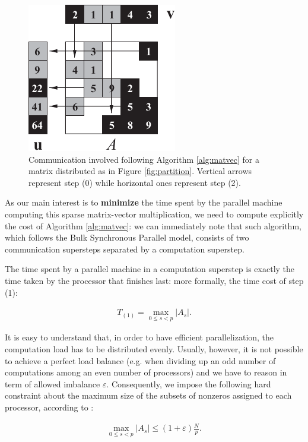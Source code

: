 \begin{figure}[h]
	\centering
	\includegraphics{img/communication}
	\caption{Communication involved following Algorithm \ref{alg:matvec} for a matrix distributed as in Figure \ref{fig:partition}. Vertical arrows represent step (0) while horizontal ones represent step (2).}
	\label{fig:communication}
\end{figure}



As our main interest is to \textbf{minimize} the time spent by the parallel machine computing this sparse matrix-vector multiplication, we need to compute explicitly the cost of Algorithm \ref{alg:matvec}: we can immediately note that such algorithm, which follows the Bulk Synchronous Parallel model\cite{bsp_paper}, consists of two communication supersteps separated by a computation superstep.

The time spent by a parallel machine in a computation superstep is exactly the time taken by the processor that finishes last: more formally, the time cost of step (1):

\begin{align}
	T_{(1)} = \max_{0 \leq s < p } |A_s|.
	\label{eq:T_comp}
\end{align}

It is easy to understand that, in order to have efficient parallelization, the computation load has to be distributed evenly. Usually, however, it is not possible to achieve a perfect load balance (e.g. when dividing up an odd number of computations among an even number of processors) and we have to reason in term of allowed imbalance $\varepsilon$. Consequently, we impose the following hard constraint about the maximum size of the subsets of nonzeros assigned to each processor, according to \cite[eq.~4.27]{BSP}:

\begin{align}
\max_{0 \leq s <p} |A_s| \leq (1+\varepsilon) \frac{N}{p}.
	\label{eq:balance}
\end{align}


